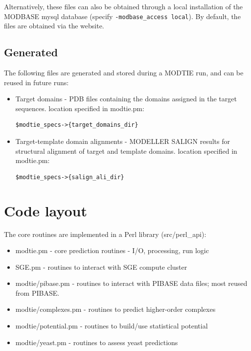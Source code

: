 \documentclass[11pt]{article}
\begin{document}
Alternatively, these files can also be obtained through a local installation of the MODBASE mysql database (specify {\tt -modbase\_access local}). By default, the files are obtained via the website.

\subsection{Generated}
The following files are generated and stored during a MODTIE run, and can be reused in future runs:
\begin{itemize}
   \item Target domains - PDB files containing the domains assigned in the target sequences. location specified in modtie.pm:
\lstset{breaklines=true,language=bash}
\lstset{frame=single}
\lstset{basicstyle=\ttfamily}
\begin{lstlisting}
$modtie_specs->{target_domains_dir}
\end{lstlisting}

   \item Target-template domain alignments - MODELLER SALIGN results for structural alignment of target and template domains. location specified in modtie.pm:
\lstset{breaklines=true,language=bash}
\lstset{frame=single}
\lstset{basicstyle=\ttfamily}
\begin{lstlisting}
$modtie_specs->{salign_ali_dir}
\end{lstlisting}
\end{itemize}

\section{Code layout}
The core routines are implemented in a Perl library (src/perl\_api):
\begin{itemize}
   \item modtie.pm - core prediction routines - I/O, processing, run logic
   \item SGE.pm - routines to interact with SGE compute cluster
   \item modtie/pibase.pm - routines to interact with PIBASE data files; most reused from PIBASE.
   \item modtie/complexes.pm - routines to predict higher-order complexes
   \item modtie/potential.pm - routines to build/use statistical potential
   \item modtie/yeast.pm - routines to assess yeast predictions
\end{itemize}
\end{document}
